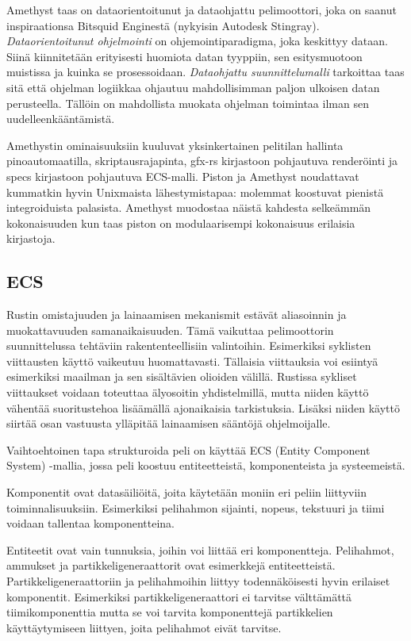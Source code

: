 \documentclass[finnish]{tktltiki2}
\theoremstyle{definition}
\theoremstyle{remark}
\begin{document}
Amethyst\cite{Amethyst} taas on dataorientoitunut ja dataohjattu pelimoottori, joka on saanut inspiraationsa Bitsquid Enginestä (nykyisin Autodesk Stingray)\cite{AmethystReadme}. \textit{Dataorientoitunut ohjelmointi} on ohjemointiparadigma, joka keskittyy dataan. Siinä kiinnitetään erityisesti huomiota datan tyyppiin, sen esitysmuotoon muistissa ja kuinka se prosessoidaan. \textit{Dataohjattu suunnittelumalli} tarkoittaa taas sitä että ohjelman logiikkaa ohjautuu mahdollisimman paljon ulkoisen datan perusteella. Tällöin on mahdollista muokata ohjelman toimintaa ilman sen uudelleenkääntämistä. \cite{AmethystGlossary}

Amethystin ominaisuuksiin kuuluvat yksinkertainen pelitilan hallinta pinoautomaatilla, skriptausrajapinta, gfx-rs kirjastoon pohjautuva renderöinti ja specs kirjastoon pohjautuva ECS-malli. Piston ja Amethyst noudattavat kummatkin hyvin Unixmaista lähestymistapaa: molemmat koostuvat pienistä integroiduista palasista. Amethyst muodostaa näistä kahdesta selkeämmän kokonaisuuden kun taas piston on modulaarisempi kokonaisuus erilaisia kirjastoja.

\subsection{ECS}
Rustin omistajuuden ja lainaamisen mekanismit estävät aliasoinnin ja muokattavuuden samanaikaisuuden. Tämä vaikuttaa pelimoottorin suunnittelussa tehtäviin rakententeellisiin valintoihin. Esimerkiksi syklisten viittausten käyttö vaikeutuu huomattavasti. Tällaisia viittauksia voi esiintyä esimerkiksi maailman ja sen sisältävien olioiden välillä. Rustissa sykliset viittaukset voidaan toteuttaa älyosoitin yhdistelmillä, mutta niiden käyttö vähentää suoritustehoa lisäämällä ajonaikaisia tarkistuksia. Lisäksi niiden käyttö siirtää osan vastuusta ylläpitää lainaamisen sääntöjä ohjelmoijalle.

Vaihtoehtoinen tapa strukturoida peli on käyttää ECS (Entity Component System) -mallia, jossa peli koostuu entiteetteistä, komponenteista ja systeemeistä.

Komponentit ovat datasäiliöitä, joita käytetään moniin eri peliin liittyviin toiminnalisuuksiin. Esimerkiksi pelihahmon sijainti, nopeus, tekstuuri ja tiimi voidaan tallentaa komponentteina.

Entiteetit ovat vain tunnuksia, joihin voi liittää eri komponentteja. Pelihahmot, ammukset ja partikkeligeneraattorit ovat esimerkkejä entiteetteistä. Partikkeligeneraattoriin ja pelihahmoihin liittyy todennäköisesti hyvin erilaiset komponentit. Esimerkiksi partikkeligeneraattori ei tarvitse välttämättä tiimikomponenttia mutta se voi tarvita komponenttejä partikkelien käyttäytymiseen liittyen, joita pelihahmot eivät tarvitse.
\end{document}
